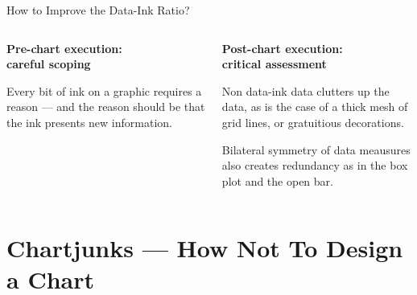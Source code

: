 \documentclass[aspectratio=1610]{beamer}
\begin{document}
\begin{frame}{How to Improve the Data-Ink Ratio?}
	\begin{columns}[t]
		\begin{column}{0.5\textwidth}
			\begin{center}
				\textbf{Pre-chart execution:\\careful scoping}
			\end{center}
			\small
			\pause
			\begin{tcolorbox}[
					colback=blue!5!white,
					colframe=blue!60!black,
					title={
							\centering
							!! Maximize the data-ink ratio !!
						}]
				\raggedright Every bit of ink on a graphic requires a reason
				--- and the reason should be that the ink presents
				new information.
			\end{tcolorbox}

		\end{column}
		\pause
		\begin{column}{0.5\textwidth}
			\begin{center}
				\textbf{Post-chart execution:\\critical assessment}
			\end{center}
			\pause
			\small
			\begin{tcolorbox}[
					colback=blue!5!white,
					colframe=blue!60!green,
					title={
							\centering
							!! Erase the non data-ink !!
						}]
				\raggedright Non data-ink data clutters up the data, as is the case
				of a thick mesh of grid lines, or gratuitious
				decorations.
			\end{tcolorbox}

			\pause

			\begin{tcolorbox}[
					colback=blue!5!white,
					colframe=blue!60!green,
					title={
							\centering
							!! Erase redundant data-ink !!
						}]
				\raggedright Bilateral symmetry of data meausures also creates
				redundancy as in the box plot and the open bar.
			\end{tcolorbox}

		\end{column}
	\end{columns}
\end{frame}


\section{Chartjunks --- How Not To Design a Chart}
\end{document}
